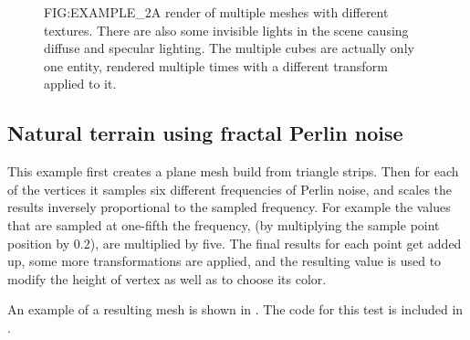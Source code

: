 \begin{figure}[Exploratory tests \textemdash\, Meshes]{FIG:EXAMPLE_2}{A render of multiple meshes with different textures. There are also some invisible lights in the scene causing diffuse and specular lighting. The multiple cubes are actually only one entity, rendered multiple times with a different transform applied to it.}
\end{figure}

\subsection{Natural terrain using fractal Perlin noise}

This example first creates a plane mesh build from triangle strips.
Then for each of the vertices it samples six different frequencies of Perlin noise,
and scales the results inversely proportional to the sampled frequency.
For example the values that are sampled at one-fifth the frequency,
(by multiplying the sample point position by 0.2),
are multiplied by five.
The final results for each point get added up,
some more transformations are applied,
and the resulting value is used to modify the height of vertex as well as to choose its color.

An example of a resulting mesh is shown in .
The code for this test is included in .


